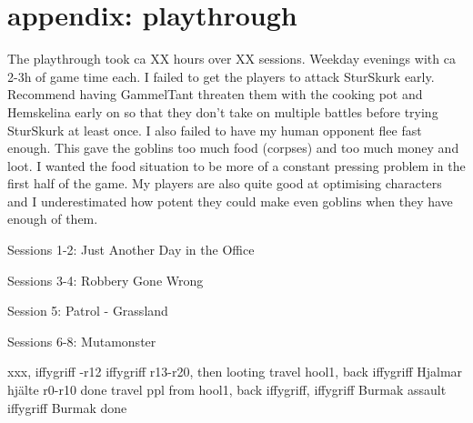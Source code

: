 \flushbottom





























\newpage
\section*{appendix: playthrough}

The playthrough took ca XX hours over XX sessions. Weekday evenings with ca 2-3h of game time each. I failed to get the players to attack SturSkurk early. Recommend having GammelTant threaten them with the cooking pot and Hemskelina early on so that they don't take on multiple battles before trying SturSkurk at least once.
I also failed to have my human opponent flee fast enough. This gave the goblins too much food (corpses) and too much money and loot. I wanted the food situation to be more of a constant pressing problem in the first half of the game. My players are also quite good at optimising characters and I underestimated how potent they could make even goblins when they have enough of them.

Sessions 1-2: Just Another Day in the Office

Sessions 3-4: Robbery Gone Wrong

Session 5: Patrol - Grassland

Sessions 6-8: Mutamonster


xxx, iffygriff -r12
iffygriff  r13-r20, then looting
travel hool1, back iffygriff Hjalmar hjälte r0-r10 done
travel ppl from hool1, back iffygriff, iffygriff Burmak assault
iffygriff Burmak done

